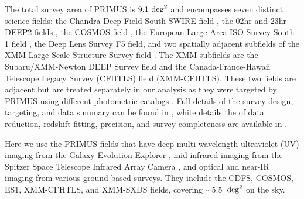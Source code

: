 The total survey area of PRIMUS is $9.1~\degsq$ and encompasses seven distinct science fields:
the Chandra Deep Field South-SWIRE field \citep[CDFS;][]{Lonsdale03},
the 02hr and 23hr DEEP2 fields \citep{Newman13},
the COSMOS field \citep{Scoville07},
the European Large Area ISO Survey-South 1 field \citep[ES1;][]{Oliver00},
the Deep Lens Survey \citep[DLS;][]{Wittman02} F5 field,
and two spatially adjacent subfields of the XMM-Large Scale Structure Survey field \citep[XMM-LSS;][]{Pierre04}.
The XMM subfields are the Subaru/XMM-Newton DEEP Survey field \citep[XMM-SXDS;][]{Furusawa08} and the Canada-France-Hawaii 
Telescope Legacy 
Survey (CFHTLS) field (XMM-CFHTLS).
These two fields are adjacent but are treated separately in our analysis 
as they were targeted by PRIMUS using different photometric catalogs \citep[see][for details]{Coil11}.
Full details of the survey design, targeting, and data summary can be found in \citet{Coil11}, white details the of data reduction, redshift 
fitting, precision, 
and survey completeness are available in \citet{Cool13}.

Here we use the PRIMUS fields that have deep multi-wavelength ultraviolet (UV) imaging from the Galaxy Evolution Explorer 
\citep[GALEX;][]{Martin05}, 
mid-infrared imaging from the Spitzer Space Telescope \citep{Werner04} Infrared Array Camera \citep[IRAC;][]{Fazio04}, and optical and 
near-IR imaging 
from various ground-based surveys.
They include the CDFS, COSMOS, ES1, XMM-CFHTLS, and XMM-SXDS fields, covering $\sim$5.5~$\degsq$ on the sky.

